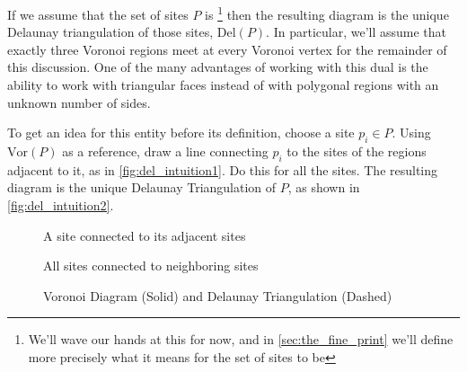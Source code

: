 \documentclass[12pt,twoside]{reedthesis}
\begin{document}
    If we assume that the set of sites $P$ is \footnote{We'll wave our hands at this for now, and in \cref{sec:the_fine_print} we'll define more precisely what it means for the set of sites to be } then the resulting diagram is the unique Delaunay triangulation of those sites, $\mbox{Del}(P)$. In particular, we'll assume that exactly three Voronoi regions meet at every Voronoi vertex for the remainder of this discussion. One of the many advantages of working with this dual is the ability to work with triangular faces instead of with polygonal regions with an unknown number of sides. \par


    To get an idea for this entity before its definition, choose a site $p_{i} \in P$. Using $\mbox{Vor}(P)$ as a reference, draw a line connecting $p_{i}$ to the sites of the regions adjacent to it, as in \cref{fig:del_intuition1}. Do this for all the sites. The resulting diagram is the unique Delaunay Triangulation of $P$, as shown in \cref{fig:del_intuition2}.

    \begin{figure}[!htb]
      \centering
      \begin{subtable}{.475\textwidth}
        
        \caption{A site connected to its adjacent sites}
        \label{fig:del_intuition1}
      \end{subtable}%
      \begin{subtable}{.475\textwidth}
        
        \caption{All sites connected to neighboring sites}
        \label{fig:del_intuition2}
      \end{subtable}
      \caption{Voronoi Diagram (Solid) and Delaunay Triangulation (Dashed)}
      \label{fig:del_intuition}
    \end{figure}

\end{document}
